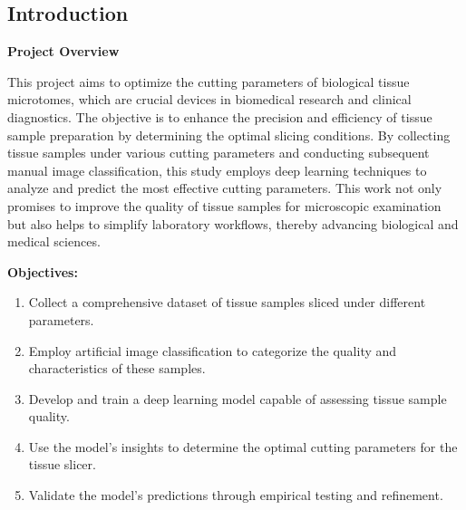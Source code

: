 \subsection{Introduction}

\textbf{Project Overview}



This project aims to optimize the cutting parameters of biological tissue microtomes, which are crucial devices in biomedical research and clinical diagnostics. The objective is to enhance the precision and efficiency of tissue sample preparation by determining the optimal slicing conditions. By collecting tissue samples under various cutting parameters and conducting subsequent manual image classification, this study employs deep learning techniques to analyze and predict the most effective cutting parameters. This work not only promises to improve the quality of tissue samples for microscopic examination but also helps to simplify laboratory workflows, thereby advancing biological and medical sciences.

\textbf{Objectives:}

\begin{enumerate}
    \item Collect a comprehensive dataset of tissue samples sliced under different parameters.
    \item Employ artificial image classification to categorize the quality and characteristics of these samples.
    \item Develop and train a deep learning model capable of assessing tissue sample quality.
    \item Use the model's insights to determine the optimal cutting parameters for the tissue slicer.
    \item Validate the model's predictions through empirical testing and refinement.
\end{enumerate}

